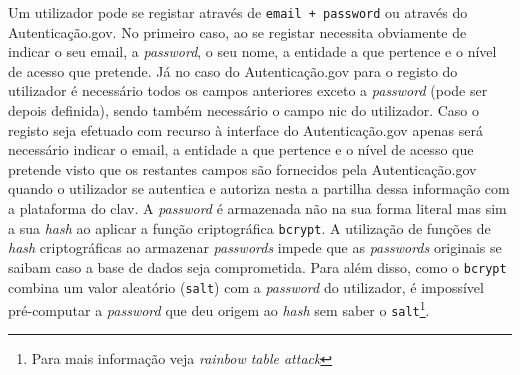 Um utilizador pode se registar através de \texttt{email + password} ou através do Autenticação.gov. No primeiro caso, ao se registar necessita obviamente de indicar o seu email, a \textit{password}, o seu nome, a entidade a que pertence e o nível de acesso que pretende. Já no caso do Autenticação.gov para o registo do utilizador é necessário todos os campos anteriores exceto a \textit{password} (pode ser depois definida), sendo também necessário o campo \acrfull{nic} do utilizador. Caso o registo seja efetuado com recurso à interface do Autenticação.gov apenas será necessário indicar o email, a entidade a que pertence e o nível de acesso que pretende visto que os restantes campos são fornecidos pela Autenticação.gov quando o utilizador se autentica e autoriza nesta a partilha dessa informação com a plataforma do \acrshort{clav}.
A \textit{password} é armazenada não na sua forma literal mas sim a sua \textit{hash} ao aplicar a função criptográfica \texttt{bcrypt}. A utilização de funções de \textit{hash} criptográficas ao armazenar \textit{passwords} impede que as \textit{passwords} originais se saibam caso a base de dados seja comprometida. Para além disso, como o \texttt{bcrypt} combina um valor aleatório (\texttt{salt}) com a \textit{password} do utilizador, é impossível pré-computar a \textit{password} que deu origem ao \textit{hash} sem saber o \texttt{salt}\footnote{Para mais informação veja \textit{rainbow table attack}}.

